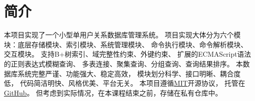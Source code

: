 \section{简介}
    本项目实现了一个小型单用户关系数据库管理系统。%
    项目实现大体分为六个模块：底层存储模块、索引模块、系统管理模块、%
    命令执行模块、命令解析模块、交互模块。%
    支持B+树索引、域完整性约束、外键约束、%
    扩展的ECMAScript语法的正则表达式模糊查询、%
    多表连接、聚集查询、分组查询、查询结果排序。%
    本数据库系统完整严谨、功能强大、稳定高效，%
    模块划分科学、接口明晰、耦合度低，%
    代码简洁明快、风格优美、平台无关。
    本项目遵循\href{http://opensource.org/licenses/MIT}{MIT}开源协议，%
    托管在\href{https://github.com/JamisHoo/Database}{GitHub}。%
    但考虑到实际情况，在本课程结束之前，存储在私有仓库中。

